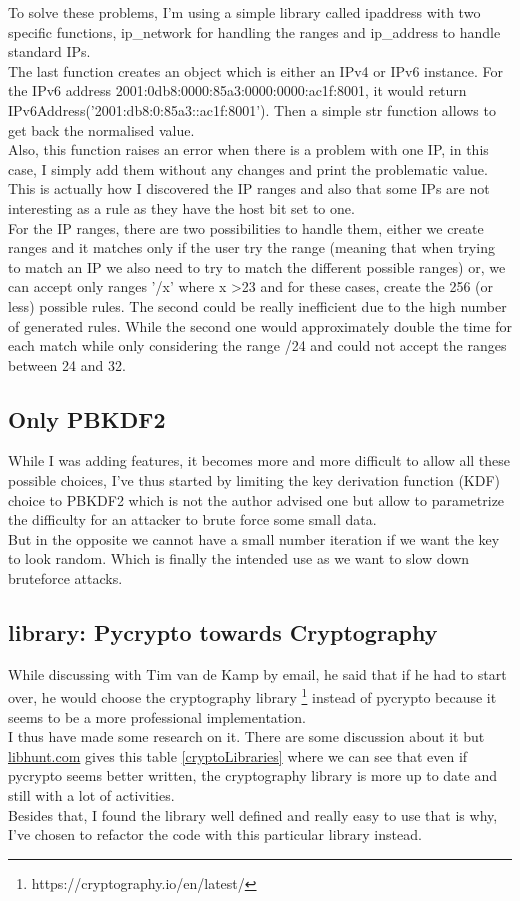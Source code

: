 \documentclass{eplmastersthesis}
\begin{document}
To solve these problems, I'm using a simple library called ipaddress with two specific functions, ip\_network for handling the ranges and ip\_address to handle standard IPs.\\
The last function creates an object which is either an IPv4 or IPv6 instance. For the IPv6 address 2001:0db8:0000:85a3:0000:0000:ac1f:8001, it would return IPv6Address('2001:db8:0:85a3::ac1f:8001'). Then a simple str function allows to get back the normalised value.\\
Also, this function raises  an error when there is a problem with one IP, in this case, I simply add them without any changes and print the problematic value.\\
This is actually how I discovered the IP ranges and also that some IPs are not interesting as a rule as they have the host bit set to one.\\

For the IP ranges, there are two possibilities to handle them, either we create ranges and it matches only if the user try the range (meaning that when trying to match an IP we also need to try to match the different possible ranges) or, we can accept only ranges '/x' where x >23 and for these cases, create the 256 (or less) possible rules.
The second could be really inefficient due to the high number of generated rules. While the second one would approximately double the time for each match while only considering the range /24 and could not accept the ranges between 24 and 32.


\subsection{Only PBKDF2}
While I was adding features, it becomes more and more difficult to allow all these possible choices, I've thus started by limiting the key derivation function (KDF) choice to PBKDF2 which is not the author advised one but allow to parametrize the difficulty for an attacker to brute force some small data.\\
But in the opposite we cannot have a small number iteration if we want the key to look random. Which is finally the intended use as we want to slow down bruteforce attacks.

\subsection{library: Pycrypto towards Cryptography}
While discussing with Tim van de Kamp by email, he said that if he had to start over, he would choose the cryptography library \footnote{https://cryptography.io/en/latest/} instead of pycrypto because it seems to be a more professional implementation.\\
I thus have made some research on it. There are some discussion about it but \url{libhunt.com} gives this table \ref{cryptoLibraries} where we can see that even if pycrypto seems better written, the cryptography library is more up to date and still with a lot of activities.\\
Besides that, I found the library well defined and really easy to use that is why, I've chosen to refactor the code with this particular library instead.
\end{document}
